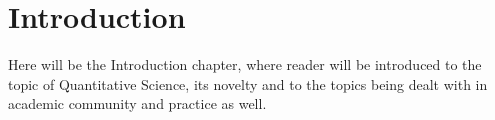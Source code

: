 \chapter*{Introduction} %

Here will be the Introduction chapter, where reader will be introduced to the topic
of Quantitative Science, its novelty and to the topics being dealt with in academic community 
and practice as well.
